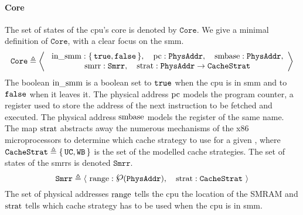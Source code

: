 \paragraph{Core}
%
The set of states of the \ac{cpu}'s core is denoted by $\texttt{Core}$. We give
a minimal definition of $\texttt{Core}$, with a clear focus on the \ac{smm}.
%
\[
  \texttt{Core} \triangleq \left<\
    \begin{array}{c}
      \mathrm{in\_smm} : \{\,\mathtt{true},
      \mathtt{false}\,\},\quad\mathrm{pc}: \texttt{PhysAddr},\quad\mathrm{smbase} :
      \texttt{PhysAddr}, \\
      \mathrm{smrr} : \texttt{Smrr},\quad\mathrm{strat} :
      \texttt{PhysAddr} \rightarrow \texttt{CacheStrat}
    \end{array}
  \right>
\]
%
The boolean $\mathrm{in\_smm}$ is a boolean set to $\mathtt{true}$ when the \ac{cpu}
is in \ac{smm} and to $\mathtt{false}$ when it leaves it.
%
The physical address $\mathrm{pc}$ models the program counter, a register used to
store the address of the next instruction to be fetched and executed.
%
The physical address $\mathrm{smbase}$ models the register of the same name.
%
The map $\mathrm{strat}$ abstracts away the numerous mechanisms of the x86
microprocessors to determine which cache strategy to use for a given \IO, where
$\texttt{CacheStrat} \triangleq \{\,\mathtt{UC}, \mathtt{WB}\,\}$ is the set of
the modelled cache strategies.
%
The set of states of the \acp{smrr} is denoted $\texttt{Smrr}$.
%
\[
  \texttt{Smrr} \triangleq \langle~\func{range}:
  \powerset(\texttt{PhysAddr}),\quad\func{strat}: \texttt{CacheStrat}~\rangle
\]
%
The set of physical addresses $\mathrm{range}$ tells the \ac{cpu} the location of
the SMRAM and $\mathrm{strat}$ tells which cache strategy has to be used when the
\ac{cpu} is in \ac{smm}.


